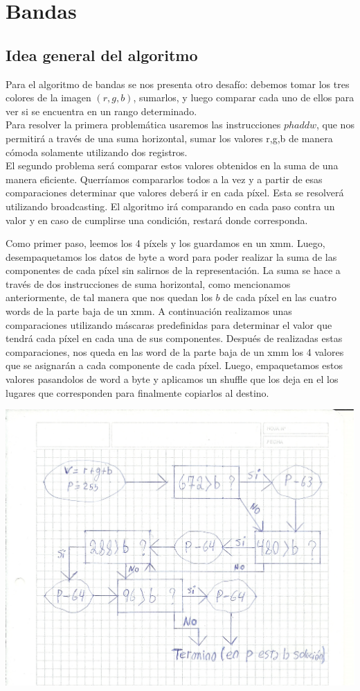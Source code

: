 \documentclass[a4paper]{article}
\begin{document}
\newpage
\section{Bandas}
\subsection{Idea general del algoritmo}
Para el algoritmo de bandas se nos presenta otro desafío: debemos tomar los tres colores de la imagen $(r,g,b)$, sumarlos, y luego comparar cada uno de ellos para ver si se encuentra en un rango determinado.
\\
Para resolver la primera problemática usaremos las instrucciones $phaddw$, que nos permitirá a través de una suma horizontal, sumar los valores r,g,b de manera cómoda solamente utilizando dos registros.
\\
El segundo problema será comparar estos valores obtenidos en la suma de una manera eficiente. Querríamos compararlos todos a la vez y a partir de esas comparaciones determinar que valores deberá ir en cada píxel. Esta se resolverá utilizando broadcasting. El algoritmo irá comparando en cada paso contra un valor y en caso de cumplirse una condición, restará donde corresponda.

Como primer paso, leemos los 4 píxels y los guardamos en un xmm. Luego, desempaquetamos los datos de byte a word para poder realizar la suma de las componentes de cada píxel sin salirnos de la representación. La suma se hace a través de dos instrucciones de suma horizontal, como mencionamos anteriormente, de tal manera que nos quedan los $b$ de cada píxel en las cuatro words de la parte baja de un xmm. A continuación realizamos unas comparaciones utilizando máscaras predefinidas para determinar el valor que tendrá cada píxel en cada una de sus componentes. Después de realizadas estas comparaciones, nos queda en las word de la parte baja de un xmm los 4 valores que se asignarán a cada componente de cada píxel. Luego, empaquetamos estos valores pasandolos de word a byte y aplicamos un shuffle que los deja en el los lugares que corresponden para finalmente copiarlos al destino. 

\includegraphics[scale=0.66]{Dibujos/B1.jpg}
\end{document}
